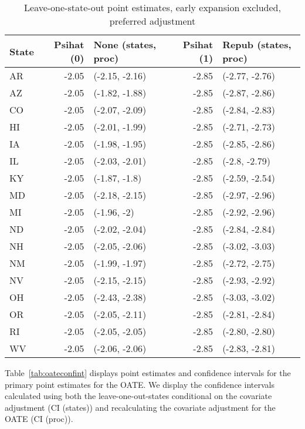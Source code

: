 \begin{table}[ht]
\centering
   \caption{Leave-one-state-out point estimates, early expansion excluded, preferred adjustment}
    \label{tab:loostatec2}
\begin{tabular}{lrlrl}
  \hline
State & Psihat (0) & None (states, proc) & Psihat (1) & Repub (states, proc) \\ 
  \hline
AR & -2.05 & (-2.15, -2.16) & -2.85 & (-2.77, -2.76) \\ 
  AZ & -2.05 & (-1.82, -1.88) & -2.85 & (-2.87, -2.86) \\ 
  CO & -2.05 & (-2.07, -2.09) & -2.85 & (-2.84, -2.83) \\ 
  HI & -2.05 & (-2.01, -1.99) & -2.85 & (-2.71, -2.73) \\ 
  IA & -2.05 & (-1.98, -1.95) & -2.85 & (-2.85, -2.86) \\ 
  IL & -2.05 & (-2.03, -2.01) & -2.85 & (-2.8, -2.79) \\ 
  KY & -2.05 & (-1.87, -1.8) & -2.85 & (-2.59, -2.54) \\ 
  MD & -2.05 & (-2.18, -2.15) & -2.85 & (-2.97, -2.96) \\ 
  MI & -2.05 & (-1.96, -2) & -2.85 & (-2.92, -2.96) \\ 
  ND & -2.05 & (-2.02, -2.04) & -2.85 & (-2.84, -2.84) \\ 
  NH & -2.05 & (-2.05, -2.06) & -2.85 & (-3.02, -3.03) \\ 
  NM & -2.05 & (-1.99, -1.97) & -2.85 & (-2.72, -2.75) \\ 
  NV & -2.05 & (-2.15, -2.15) & -2.85 & (-2.93, -2.92) \\ 
  OH & -2.05 & (-2.43, -2.38) & -2.85 & (-3.03, -3.02) \\ 
  OR & -2.05 & (-2.05, -2.11) & -2.85 & (-2.81, -2.84) \\ 
  RI & -2.05 & (-2.05, -2.05) & -2.85 & (-2.80, -2.80) \\ 
  WV & -2.05 & (-2.06, -2.06) & -2.85 & (-2.83, -2.81) \\ 
   \hline
\end{tabular}
\end{table}

Table~\ref{tab:oateconfint} displays point estimates and confidence intervals for the primary point estimates for the OATE. We display the confidence intervals calculated using both the leave-one-out-states conditional on the covariate adjustment (CI (states)) and recalculating the covariate adjustment for the OATE (CI (proc)). 

